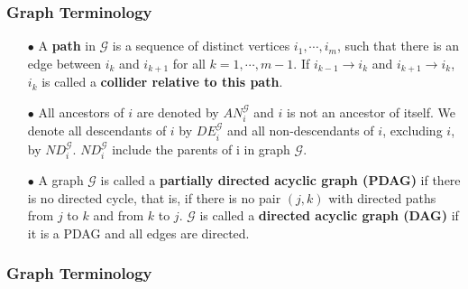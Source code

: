 \documentclass{beamer}
\begin{document}
\begin{frame}
    \frametitle{Graph Terminology}
    \begin{itemize}
        \item[$\bullet$] A \textbf{path} in $\mathcal{G}$ is a sequence of distinct vertices $i_1,\cdots,i_m$, such that
        there is an edge between $i_k$ and $i_{k+1}$ for all $k = 1,\cdots,m-1$. If $i_{k-1}\rightarrow i_k$ and
        $i_{k+1}\rightarrow i_k$, $i_k$ is called a \textbf{collider relative to this path}.
        \item[$\bullet$] All ancestors of $i$ are denoted by $AN_i^{\mathcal{G}}$ and $i$ is not
        an ancestor of itself. We denote all descendants of $i$ by $DE_i^{\mathcal{G}}$ and all non-descendants of $i$,
        excluding $i$, by $ND_i^{\mathcal{G}}$. $ND_i^{\mathcal{G}}$ include the parents of i in graph $\mathcal{G}$.
        \item[$\bullet$] A graph $\mathcal{G}$ is called a \textbf{partially directed acyclic graph (PDAG)} if there is no
        directed cycle, that is, if there is no pair $(j, k)$ with directed paths from $j$ to $k$ and
        from $k$ to $j$. $\mathcal{G}$ is called a \textbf{directed acyclic graph (DAG)} if it is a PDAG and all
        edges are directed.
    \end{itemize}
\end{frame}

\begin{frame}
    \frametitle{Graph Terminology} 
\end{frame}
\end{document}
